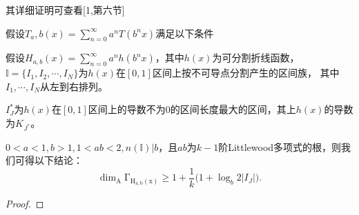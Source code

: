 其详细证明可查看[1,第六节]

\begin{lemma}
      假设$T_a,b(x)=\sum_{n=0}^\infty a^nT(b^nx)$满足以下条件
\end{lemma}


假设$H_{a,b}(x)=\sum_{n=0}^\infty a^nh(b^nx)$，其中$h(x)$为可分割折线函数，
$\mathbb{I}=\{I_1,I_2,\cdots,I_N\}$为$h(x)$在$[0,1]$区间上按不可导点分割产生的区间族，
其中$I_1,\cdots,I_N$从左到右排列。

$I_J^*$为$h(x)$在$[0,1]$区间上的导数不为$0$的区间长度最大的区间，其上$h(x)$的导数为$K_{J^*}$。

$0<a<1,b>1,1<ab<2,n(\mathbb{I})|b$，且$ab$为$k-1$阶Littlewood多项式的根，则我们可得以下结论：
$$
      \mathrm{\dim_A\Gamma_{H_{a,b}(x)}}\ge1+\frac{1}{k}\Big(1+\log_b2|I_J|\Big).
$$

\begin{proof}

\end{proof}
